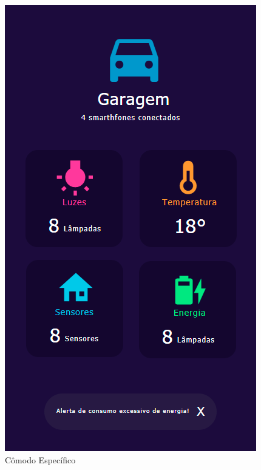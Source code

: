                 \graphicspath{ {figuras/} }
                \begin{figure}[h]
                    \centering
                    \includegraphics[scale=0.35]{3}
                    \caption{Cômodo Específico}
                    \label{fig:comodo}
                \end{figure}
	                


